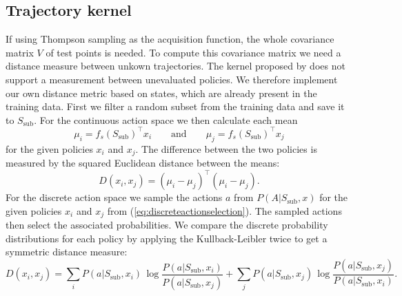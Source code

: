 \subsection{Trajectory kernel}
\label{sec:ownTK}
If using Thompson sampling as the acquisition function, the whole covariance matrix $V$ of test points is needed. To compute this covariance matrix we need a distance measure between unkown trajectories. The kernel proposed by \cite{wilson2014using} does not support a measurement between unevaluated policies. We therefore implement our own distance metric based on states, which are already present in the training data. First we filter a random subset from the training data and save it to $S_{\text{sub}}$. For the continuous action space we then calculate each mean
$$\mu_i = f_s(S_{\text{sub}})^\top x_i \qquad \text{and}\qquad \mu_j = f_s(S_{\text{sub}})^\top x_j$$
for the given policies $x_i$ and $x_j$. The difference between the two policies is measured by the squared Euclidean distance between the means:
$$D(x_i,x_j) = (\mu_i - \mu_j)^\top (\mu_i - \mu_j).$$
For the discrete action space we sample the actions $a$ from $P(A|S_{\text{sub}},x)$ for the given policies $x_i$ and $x_j$ from (\ref{eq:discreteactionselection}). The sampled actions then select the associated probabilities. We compare the discrete probability distributions for each policy by applying the Kullback-Leibler twice to get a symmetric distance measure:
$$D(x_i,x_j) = \sum _{i}P(a|S_{\text{sub}},x_i)\,\log {\frac {P(a|S_{\text{sub}},x_i)}{P(a|S_{\text{sub}},x_j)}} + \sum _{j}P(a|S_{\text{sub}},x_j)\,\log {\frac {P(a|S_{\text{sub}},x_j)}{P(a|S_{\text{sub}},x_i)}}.$$

%

